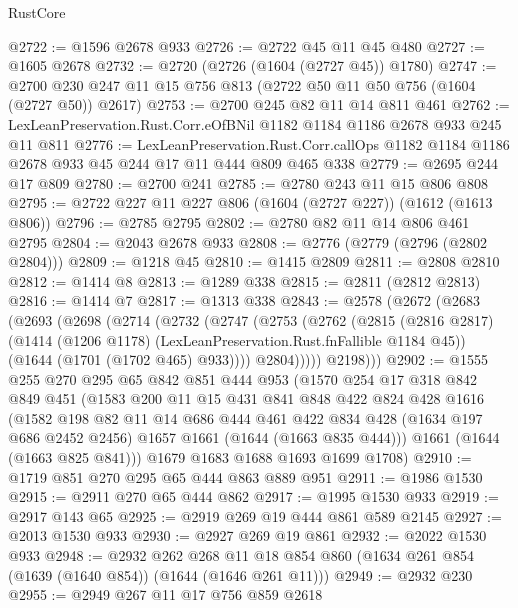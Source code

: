 \begin{lexlean}{RustCore}
\begin{coremodule}
@2722 := @1596 @2678 @933
@2726 := @2722 @45 @11 @45 @480
@2727 := @1605 @2678
@2732 := @2720 (@2726 (@1604 (@2727 @45)) @1780)
@2747 := @2700 @230 @247 @11 @15 @756 @813 (@2722 @50 @11 @50 @756 (@1604 (@2727 @50)) @2617)
@2753 := @2700 @245 @82 @11 @14 @811 @461
@2762 := LexLeanPreservation.Rust.Corr.eOfBNil @1182 @1184 @1186 @2678 @933 @245 @11 @811
@2776 := LexLeanPreservation.Rust.Corr.callOps
    @1182
    @1184
    @1186
    @2678
    @933
    @45
    @244
    @17
    @11
    @444
    @809
    @465
    @338
@2779 := @2695 @244 @17 @809
@2780 := @2700 @241
@2785 := @2780 @243 @11 @15 @806 @808
@2795 := @2722 @227 @11 @227 @806 (@1604 (@2727 @227)) (@1612 (@1613 @806))
@2796 := @2785 @2795
@2802 := @2780 @82 @11 @14 @806 @461 @2795
@2804 := @2043 @2678 @933
@2808 := @2776 (@2779 (@2796 (@2802 @2804)))
@2809 := @1218 @45
@2810 := @1415 @2809
@2811 := @2808 @2810
@2812 := @1414 @8
@2813 := @1289 @338
@2815 := @2811 (@2812 @2813)
@2816 := @1414 @7
@2817 := @1313 @338
@2843 := @2578
    (@2672
      (@2683
        (@2693
          (@2698
            (@2714
              (@2732
                (@2747
                  (@2753
                    (@2762
                      (@2815
                        (@2816 @2817)
                        (@1414 (@1206 @1178) (LexLeanPreservation.Rust.fnFallible @1184 @45))
                        (@1644 (@1701 (@1702 @465) @933))))
                    @2804)))))
          @2198)))
@2902 := @1555
    @255
    @270
    @295
    @65
    @842
    @851
    @444
    @953
    (@1570
      @254
      @17
      @318
      @842
      @849
      @451
      (@1583
        @200
        @11
        @15
        @431
        @841
        @848
        @422
        @824
        @428
        @1616
        (@1582
          @198
          @82
          @11
          @14
          @686
          @444
          @461
          @422
          @834
          @428
          (@1634 @197 @686 @2452 @2456)
          @1657
          @1661
          (@1644 (@1663 @835 @444)))
        @1661
        (@1644 (@1663 @825 @841)))
      @1679
      @1683
      @1688
      @1693
      @1699
      @1708)
@2910 := @1719 @851 @270 @295 @65 @444 @863 @889 @951
@2911 := @1986 @1530
@2915 := @2911 @270 @65 @444 @862
@2917 := @1995 @1530 @933
@2919 := @2917 @143 @65
@2925 := @2919 @269 @19 @444 @861 @589 @2145
@2927 := @2013 @1530 @933
@2930 := @2927 @269 @19 @861
@2932 := @2022 @1530 @933
@2948 := @2932
    @262
    @268
    @11
    @18
    @854
    @860
    (@1634 @261 @854 (@1639 (@1640 @854)) (@1644 (@1646 @261 @11)))
@2949 := @2932 @230
@2955 := @2949 @267 @11 @17 @756 @859 @2618

\end{coremodule}
\end{lexlean}
